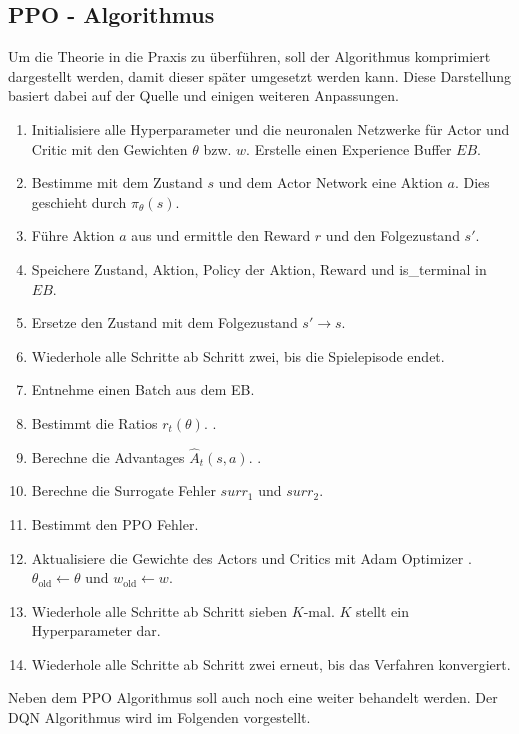\subsection{PPO - Algorithmus} \label{subsec:Grundlagen_PPO_Algorithmus}
Um die Theorie in die Praxis zu überführen, soll der Algorithmus komprimiert dargestellt werden, damit dieser später umgesetzt werden kann. 
Diese Darstellung basiert dabei auf der Quelle \citep{PPO} und einigen weiteren Anpassungen.
\begin{enumerate}
	\item Initialisiere alle Hyperparameter und die neuronalen Netzwerke für Actor und Critic mit den Gewichten $\theta$ bzw. $w$. Erstelle einen Experience Buffer $EB$.
	\item Bestimme mit dem Zustand $s$ und dem Actor Network eine Aktion $a$. Dies geschieht durch $\pi_{\theta}(s)$.
	\item Führe Aktion $a$ aus und ermittle den Reward $r$ und den Folgezustand $s'$.
	\item Speichere Zustand, Aktion, Policy der Aktion, Reward und is\_terminal in $EB$.
	\item Ersetze den Zustand mit dem Folgezustand $s' \longrightarrow s$.
	\item Wiederhole alle Schritte ab Schritt zwei, bis die Spielepisode endet.
	\item Entnehme einen Batch aus dem EB.
	\item Bestimmt die Ratios $r_t(\theta)$. .
	\item Berechne die Advantages $\hat{A}_{t}(s, a)$. .
	\item Berechne die Surrogate Fehler  $surr_1$ und $surr_2$.
	\item Bestimmt den PPO Fehler. 
	\item Aktualisiere die Gewichte des Actors und Critics mit Adam Optimizer \citep{PPO}. $\theta_{\text{old}} \longleftarrow \theta$ und $w_{\text{old}} \longleftarrow w$.
	\item Wiederhole alle Schritte ab Schritt sieben $K$-mal. $K$ stellt ein Hyperparameter dar.
	\item Wiederhole alle Schritte ab Schritt zwei erneut, bis das Verfahren konvergiert.
\end{enumerate}
Neben dem PPO Algorithmus soll auch noch eine weiter behandelt werden. Der DQN Algorithmus wird im Folgenden vorgestellt.

